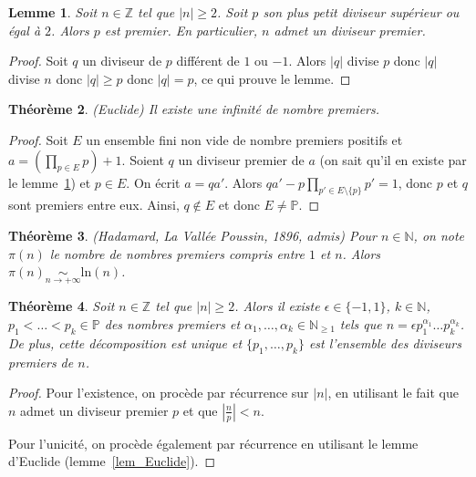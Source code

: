 \documentclass[12pt]{report}
\newtheorem{thm}{Théorème}[chapter]
\newtheorem{theoreme}[thm]{Théorème}
\newtheorem{Lem}[thm]{Lemme}
\newcommand{\N}{\mathbb{N}}
\newcommand{\Z}{\mathbb{Z}}
\begin{document}
\begin{Lem}\label{lemExistence_diviseur_premier}
Soit $n\in \Z$ tel que $|n|\geq 2$. Soit $p$ son plus petit diviseur supérieur ou égal à $2$. Alors $p$ est premier. En particulier, $n$ admet un diviseur premier.
\end{Lem}

\begin{proof}
Soit $q$ un diviseur de $p$ différent de $1$ ou $-1$. Alors $|q|$ divise $p$ donc $|q|$ divise $n$ donc $|q|\geq p$ donc $|q|=p$, ce qui prouve le lemme.
\end{proof}

\begin{theoreme}(Euclide)
Il existe une infinité de nombre premiers.
\end{theoreme}

\begin{proof}
Soit $E$ un ensemble fini non vide de nombre premiers positifs et $a=(\prod_{p\in E} p)+1$. Soient $q$ un diviseur premier de $a$ (on sait qu'il en existe par le lemme~\ref{lemExistence_diviseur_premier}) et $p\in E$. On écrit $a=qa'$.  Alors $qa'-p\prod_{p'\in E\setminus \{p\}} p'=1$, donc $p$ et $q$ sont premiers entre eux. Ainsi, $q\notin E$ et donc $E\neq \mathbb{P}$.
\end{proof}


\begin{theoreme}\label{thmHadamard_lavallee_poussin}(Hadamard, La Vallée Poussin, 1896, admis)
Pour $n\in \N$, on note $\pi(n)$ le nombre de nombres premiers compris entre $1$ et $n$. Alors $\pi(n)\underset{n\rightarrow +\infty}{\sim} \mathrm{ln}(n)$. 

\end{theoreme}

\begin{thm}\label{thmDécomposition_produit_facteurs_premiers}
Soit $n\in \Z$ tel que $|n|\geq 2$. Alors il existe $\epsilon\in \{-1,1\}$, $k\in \N$, $p_1<\ldots <p_k\in \mathbb{P}$ des nombres premiers  et $\alpha_1,\ldots,\alpha_k\in\N_{\geq 1}$ tels que $n=\epsilon p_1^{\alpha_1}\ldots p_k^{\alpha_k}$. De plus, cette décomposition est unique et $\{p_1,\ldots,p_k\}$ est l'ensemble des diviseurs premiers de $n$.
\end{thm}

\begin{proof}
Pour l'existence, on procède par récurrence sur $|n|$, en utilisant le fait que $n$ admet un diviseur premier $p$ et que $|\frac{n}{p}|<n$.

Pour l'unicité, on procède également par récurrence en utilisant le lemme d'Euclide (lemme~\ref{lem_Euclide}).
\end{proof}
\end{document}
